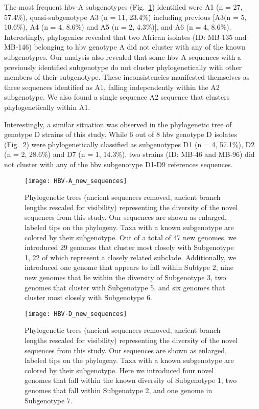 The most frequent \gls{hbv}-A subgenotypes (Fig.~\ref{fig:HBV-A_new_sequences}) identified were A1 (n = 27, 57.4\%), quasi-subgenotype A3 (n = 11, 23.4\%) including previous [A3(n = 5, 10.6\%), A4 (n = 4, 8.6\%) and A5 (n = 2, 4.3\%)], and A6 (n = 4, 8.6\%).
Interestingly, phylogenies revealed that two African isolates (ID: MB-135 and MB-146) belonging to \gls{hbv} genotype A did not cluster with any of the known subgenotypes.
Our analysis also revealed that some \gls{hbv}-A sequences with a previously identified subgenotype do not cluster phylogenetically with other members of their subgenotype. %
These inconsistencies manifested themselves as three sequences identified as A1, falling independently within the A2 subgenotype.
We also found a single sequence A2 sequence that clusters phylogenetically within A1.

Interestingly, a similar situation was observed in the phylogenetic tree of genotype D strains of this study.
While 6 out of 8 \gls{hbv} genotype D isolates (Fig.~\ref{fig:HBV-D_new_sequences}) were phylogenetically classified as subgenotypes D1 (n = 4, 57.1\%), D2 (n = 2, 28.6\%) and D7 (n = 1, 14.3\%), two strains (ID: MB-46 and MB-96) did not cluster with any of the \gls{hbv} subgenotype D1-D9 references sequences.


\begin{figure}[ht]
  \centering
  \medskip
  \texttt{[image: HBV-A\_new\_sequences]}
  \caption[HBV-A New sequences]{Phylogenetic trees (ancient sequences removed, ancient branch lengths rescaled for visibility) representing the diversity of the novel sequences from this study. Our sequences are shown as enlarged, labeled tips on the phylogeny. Taxa with a known subgenotype are colored by their subgenotype. Out of a total of 47 new genomes, we introduced 29 genomes that cluster most closely with Subgenotype 1, 22 of which represent a closely related subclade. Additionally, we introduced one genome that appears to fall within Subtype 2, nine new genomes that lie within the diversity of Subgenotype 3, two genomes that cluster with Subgenotype 5, and six genomes that cluster most closely with Subgenotype 6.}
  \label{fig:HBV-A_new_sequences}
\end{figure}

\begin{figure}[ht]
  \centering
  \medskip
  \texttt{[image: HBV-D\_new\_sequences]}
  \caption[HBV-D New sequences]{Phylogenetic trees (ancient sequences removed, ancient branch lengths rescaled for visibility) representing the diversity of the novel sequences from this study. Our sequences are shown as enlarged, labeled tips on the phylogeny. Taxa with a known subgenotype are colored by their subgenotype. Here we introduced four novel genomes that fall within the known diversity of Subgenotype 1, two genomes that fall within Subgenotype 2, and one genome in Subgenotype 7.}
  \label{fig:HBV-D_new_sequences}
\end{figure}

